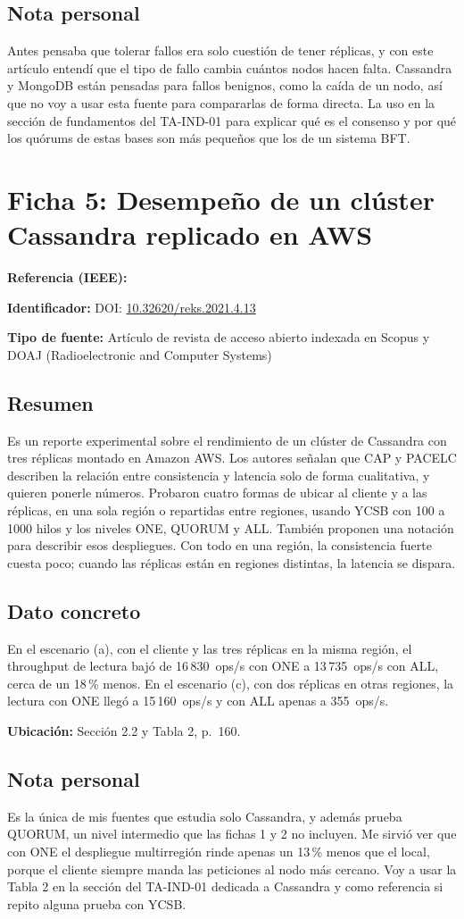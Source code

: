 \documentclass[11pt,a4paper]{article}
\newcommand{\campo}[2]{\noindent\textbf{#1:} #2\par\smallskip}
\newcommand{\ficha}[1]{\section*{#1}}
\newcommand{\parte}[1]{\subsection*{#1}}
\begin{document}
\parte{Nota personal}
Antes pensaba que tolerar fallos era solo cuestión de tener réplicas, y con este artículo
entendí que el tipo de fallo cambia cuántos nodos hacen falta. Cassandra y MongoDB están
pensadas para fallos benignos, como la caída de un nodo, así que no voy a usar esta fuente
para compararlas de forma directa. La uso en la sección de fundamentos del TA-IND-01 para
explicar qué es el consenso y por qué los quórums de estas bases son más pequeños que los
de un sistema BFT.

\ficha{Ficha 5: Desempeño de un clúster Cassandra replicado en AWS}

\campo{Referencia (IEEE)}{}
\campo{Identificador}{DOI: \href{https://doi.org/10.32620/reks.2021.4.13}{10.32620/reks.2021.4.13}}
\campo{Tipo de fuente}{Artículo de revista de acceso abierto indexada en Scopus y DOAJ
(Radioelectronic and Computer Systems)}

\parte{Resumen}
Es un reporte experimental sobre el rendimiento de un clúster de Cassandra con tres
réplicas montado en Amazon AWS. Los autores señalan que CAP y PACELC describen la
relación entre consistencia y latencia solo de forma cualitativa, y quieren ponerle números.
Probaron cuatro formas de ubicar al cliente y a las réplicas, en una sola región o repartidas
entre regiones, usando YCSB con 100 a 1000 hilos y los niveles ONE, QUORUM y ALL.
También proponen una notación para describir esos despliegues. Con todo en una región,
la consistencia fuerte cuesta poco; cuando las réplicas están en regiones distintas, la
latencia se dispara.

\parte{Dato concreto}
En el escenario (a), con el cliente y las tres réplicas en la misma región, el throughput
de lectura bajó de 16\,830~ops/s con ONE a 13\,735~ops/s con ALL, cerca de un 18\,\% menos.
En el escenario (c), con dos réplicas en otras regiones, la lectura con ONE llegó a
15\,160~ops/s y con ALL apenas a 355~ops/s.

\campo{Ubicación}{Sección 2.2 y Tabla 2, p.~160.}

\parte{Nota personal}
Es la única de mis fuentes que estudia solo Cassandra, y además prueba QUORUM, un nivel
intermedio que las fichas 1 y 2 no incluyen. Me sirvió ver que con ONE el despliegue
multirregión rinde apenas un 13\,\% menos que el local, porque el cliente siempre manda las
peticiones al nodo más cercano. Voy a usar la Tabla 2 en la sección del TA-IND-01
dedicada a Cassandra y como referencia si repito alguna prueba con YCSB.
\end{document}
